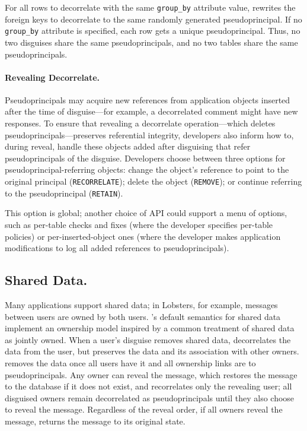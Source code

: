 %
For all rows to decorrelate with the same \texttt{group\_by} attribute value,
\sys rewrites the foreign keys to decorrelate to the same randomly generated
pseudoprincipal.
%
If no \texttt{group\_by} attribute is specified, each row gets a unique
pseudoprincipal.
%
Thus, no two disguises share the same pseudoprincipals, and no two tables share
the same pseudoprincipals.
%

%
\paragraph{Revealing Decorrelate.}
%
Pseudoprincipals may acquire new references from application objects inserted
after the time of disguise---for example, a decorrelated comment might have new
responses. To ensure that revealing a decorrelate operation---which deletes
pseudoprincipals---preserves referential integrity, developers also inform \sys
how to, during reveal, handle these objects added after disguising that refer
pseudoprincipals of the disguise. 
%
Developers choose between three options for
pseudoprincipal-referring objects: \one{} change the object's reference to point
to the original principal (\texttt{RECORRELATE}); \two{} delete the object
(\texttt{REMOVE}); or \three{} continue referring to the pseudoprincipal
(\texttt{RETAIN}).
%

This option is global; another choice of API could support a menu of
options, such as per-table checks and fixes (where the developer specifies
per-table policies) or per-inserted-object ones (where the developer makes
application modifications to log all added references to pseudoprincipals).
%

\subsection{Shared Data.}

%
Many applications support shared data; in Lobsters, for example, messages
between users are owned by both users.
%
\sys's default semantics for shared data implement an ownership model inspired
by a common treatment of shared data as jointly owned.
%
When a user's disguise removes shared data, \sys decorrelates the data from the \xxing user,
but preserves the data and its association with other owners.
%
\sys removes the data once all users have \xxed it and all ownership links are
to pseudoprincipals.
%
Any owner can reveal the message, which restores the message to the database if
it does not exist, and recorrelates only the revealing user; all disguised
owners remain decorrelated as pseudoprincipals until they also choose to reveal
the message.
%
Regardless of the reveal order, if all owners reveal the message, \sys returns
the message to its original state.
%

